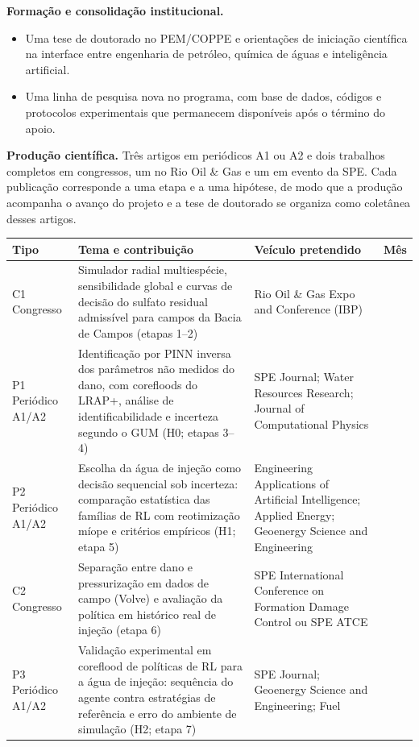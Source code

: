 \documentclass[11pt,a4paper]{article}
\begin{document}
\textbf{Formação e consolidação institucional.}
\begin{itemize}
  \item Uma tese de doutorado no PEM/COPPE e orientações de iniciação científica na
        interface entre engenharia de petróleo, química de águas e inteligência
        artificial.
  \item Uma linha de pesquisa nova no programa, com base de dados, códigos e protocolos
        experimentais que permanecem disponíveis após o término do apoio.
\end{itemize}

\textbf{Produção científica.} Três artigos em periódicos A1 ou A2 e dois trabalhos
completos em congressos, um no Rio Oil \& Gas e um em evento da SPE. Cada publicação
corresponde a uma etapa e a uma hipótese, de modo que a produção acompanha o avanço do
projeto e a tese de doutorado se organiza como coletânea desses artigos.

\begin{center}
\footnotesize
\renewcommand{\arraystretch}{1.05}
\begin{tabularx}{\textwidth}{@{}>{\raggedright\arraybackslash}p{}>{\raggedright\arraybackslash}X>{\raggedright\arraybackslash}p{}>{\centering\arraybackslash}p{}@{}}
\toprule
\textbf{Tipo} & \textbf{Tema e contribuição} & \textbf{Veículo pretendido} & \textbf{Mês} \\
\midrule
C1 Congresso & Simulador radial multiespécie, sensibilidade global e curvas de decisão do sulfato residual admissível para campos da Bacia de Campos (etapas 1--2) & Rio Oil \& Gas Expo and Conference (IBP) & 20 \\
P1 Periódico A1/A2 & Identificação por PINN inversa dos parâmetros não medidos do dano, com corefloods do LRAP+, análise de identificabilidade e incerteza segundo o GUM (H0; etapas 3--4) & SPE Journal; Water Resources Research; Journal of Computational Physics & 28 \\
P2 Periódico A1/A2 & Escolha da água de injeção como decisão sequencial sob incerteza: comparação estatística das famílias de RL com reotimização míope e critérios empíricos (H1; etapa 5) & Engineering Applications of Artificial Intelligence; Applied Energy; Geoenergy Science and Engineering & 36 \\
C2 Congresso & Separação entre dano e pressurização em dados de campo (Volve) e avaliação da política em histórico real de injeção (etapa 6) & SPE International Conference on Formation Damage Control ou SPE ATCE & 40 \\
P3 Periódico A1/A2 & Validação experimental em coreflood de políticas de RL para a água de injeção: sequência do agente contra estratégias de referência e erro do ambiente de simulação (H2; etapa 7) & SPE Journal; Geoenergy Science and Engineering; Fuel & 46 \\
\bottomrule
\end{tabularx}
\end{center}
\end{document}
